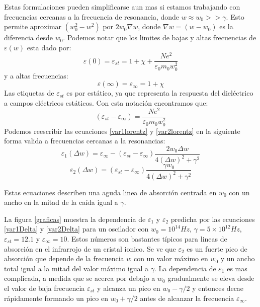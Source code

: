 \documentclass[a4paper,openright,12pt]{book}
\begin{document}
Estas formulaciones pueden simplificarse aun mas si estamos trabajando con frecuencias cercanas a la frecuencia de resonancia, donde $w\approx w_{0}>>\gamma$. Esto permite aproximar $(w_{0}^{2}-w^{2})$
por $2w_{0}\nabla w$, donde $\nabla w=(w-w_{0})$ es la diferencia desde $w_{0}$. Podemos notar que los limites de bajas y altas frecuencias de $\varepsilon(w)$ esta dado por:
\begin{equation}
\varepsilon(0)=\varepsilon_{st}=1+\chi +\frac{Ne^{2}}{\varepsilon_{0}m_{0}w_{0}^{2}}
\end{equation} 
y a altas frecuencias:
\begin{equation}
\varepsilon(\infty)=\varepsilon_{\infty}=1+\chi
\end{equation}
Las etiquetas de $\varepsilon_{st}$ es por estático, ya que representa la respuesta del dieléctrico a campos eléctricos estáticos. Con esta notación encontramos que:
\begin{equation}\label{ecuacion219}
(\varepsilon_{st}-\varepsilon_{\infty})=\frac{Ne^{2}}{\varepsilon_{0}m_{0}w_{0}^{2}}
\end{equation}
Podemos reescribir las ecuaciones \ref{var1lorentz} y \ref{var2lorentz} en la siguiente forma valida a frecuencias cercanas a la resonancias:
\begin{equation}\label{var1Delta}
\varepsilon_{1}(\Delta w)=\varepsilon_{\infty}-(\varepsilon_{st}-\varepsilon_{\infty})\frac{2w_{0}\Delta w}{4(\Delta w)^{2}+\gamma^{2}}
\end{equation}
\begin{equation}\label{var2Delta}
\varepsilon_{2}(\Delta w)=(\varepsilon_{st}-\varepsilon_{\infty})\frac{\gamma w_{0}}{4(\Delta w)^{2}+\gamma^{2}}
\end{equation}

Estas ecuaciones describen una aguda linea de absorción centrada en $w_{0}$ con un ancho en la mitad de la caída igual a $\gamma $.

La figura \ref{graficas} muestra la dependencia de $\varepsilon_{1}$ y $\varepsilon_{2}$ predicha por las ecuaciones \ref{var1Delta} y \ref{var2Delta} para un oscilador con $w_{0}=10^{14}Hz$, $\gamma=5\times 10^{12}Hz$, $\varepsilon_{st}=12.1$ y $\varepsilon_{\infty}=10$. Estos números son bastantes típicos para lineas de absorción en el infrarrojo de un cristal ionico. Se ve que $\varepsilon_{2}$ es un fuerte pico de absorción que depende de la frecuencia $w$ con un valor máximo en $w_{0}$ y un ancho total igual a la mitad del valor máximo igual a $\gamma $. La dependencia de $\varepsilon_{1}$ es mas complicada, a medida que se acerca por debajo a $w_{0}$ gradualmente se eleva desde el valor de baja frecuencia $\varepsilon_{st}$ y alcanza un pico en $w_{0}-\gamma /2$ y entonces decae rápidamente formando un pico en $w_{0}+\gamma /2$ antes de alcanzar la frecuencia $\varepsilon_{\infty}$.
\end{document}
